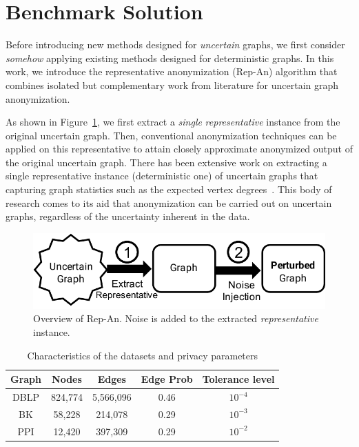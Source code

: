 \section{Benchmark Solution}
\label{sec:repOB}
Before introducing new methods designed for \emph{uncertain} graphs, we first consider \emph{somehow} applying existing methods designed for deterministic graphs. 
In this work, we introduce the representative anonymization (Rep-An) algorithm that combines isolated but complementary work from literature for uncertain graph anonymization. 

As shown in Figure~\ref{fig:repOB}, we first extract a \emph{single} \emph{representative} instance from the original uncertain graph. Then, conventional anonymization techniques can be applied on this representative to attain closely approximate anonymized output of the original uncertain graph. There has been extensive work on extracting a single representative instance (deterministic one) of uncertain graphs that capturing graph statistics such as the expected vertex degrees~\cite{Parchas_Gullo_Papadias_Bonchi_2014}. This body of research comes to its aid that anonymization can be carried out on uncertain graphs, regardless of the uncertainty inherent in the data. 

\begin{figure}[t]
  \vspace{-1em}
    \captionsetup{margin=0cm}
    \centering  
        \includegraphics[width=0.95\columnwidth]{AddFigure/repOB.pdf}
        \vspace{-3pt}
      \caption{Overview of Rep-An. Noise is added to the extracted \emph{representative} instance.}
    \label{fig:repOB}
    \vspace{-0.5em}
\end{figure}

\begin{table}[t]
    \centering
        \caption{Characteristics of the datasets and privacy parameters}
        \begin{tabular}{|c|c|c|c||c|}
        \hline 
        Graph    & Nodes    & Edges    &Edge Prob    & Tolerance level\\
        \hline  
        DBLP     &824,774   &5,566,096 & 0.46        & $10^{-4}$\\
        BK       &58,228   & 214,078 &0.29 &$10^{-3}$ \\
        PPI      &12,420   & 397,309  & 0.29         &$10^{-2}$\\
        \hline
        \end{tabular}
        \label{tab:dataset}
\end{table}

